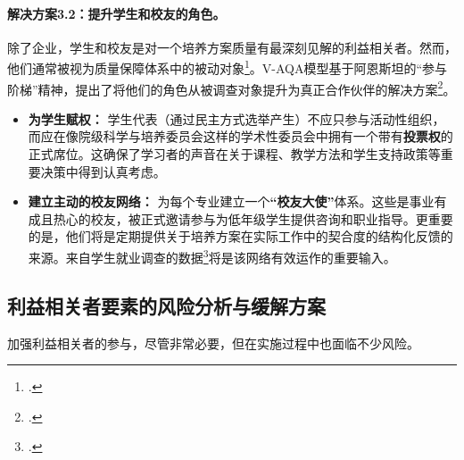 \paragraph{解决方案3.2：提升学生和校友的角色。}
除了企业，学生和校友是对一个培养方案质量有最深刻见解的利益相关者。然而，他们通常被视为质量保障体系中的被动对象\footcite{pmc_article_9127449}。V-AQA模型基于阿恩斯坦的“参与阶梯”精神，提出了将他们的角色从被调查对象提升为真正合作伙伴的解决方案\footcite{Arnstein1969}。
\begin{itemize}
    \item \textbf{为学生赋权：} 学生代表（通过民主方式选举产生）不应只参与活动性组织，而应在像院级科学与培养委员会这样的学术性委员会中拥有一个带有\textbf{投票权}的正式席位。这确保了学习者的声音在关于课程、教学方法和学生支持政策等重要决策中得到认真考虑。
    \item \textbf{建立主动的校友网络：} 为每个专业建立一个\textbf{“校友大使”}体系。这些是事业有成且热心的校友，被正式邀请参与为低年级学生提供咨询和职业指导。更重要的是，他们将是定期提供关于培养方案在实际工作中的契合度的结构化反馈的来源。来自学生就业调查的数据\footcite{moet_graduate_survey}将是该网络有效运作的重要输入。
\end{itemize}

\subsection{利益相关者要素的风险分析与缓解方案}
\label{subsec:risk_lienquan}
加强利益相关者的参与，尽管非常必要，但在实施过程中也面临不少风险。

